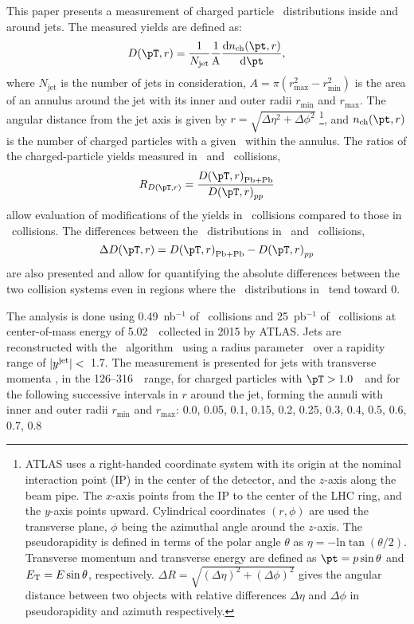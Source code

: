 This paper presents a measurement of charged particle \pt\ distributions inside and around jets. The measured yields are defined as:
  \begin{equation}
  \Dptr = \frac{1}{N_{\mathrm{jet}}} \frac{1}{\mathrm{A}} \frac{\mathrm{d} n_{\mathrm{ch}} (\pt, r)}{\mathrm{d} \pt},
\end{equation}
where $N_{\mathrm{jet}}$ is the number of jets in consideration, $A = \pi (r_{\mathrm{max}}^2 - r_{\mathrm{min}}^2) $ is the area of an annulus around the jet with its inner and outer radii $r_{\mathrm{min}}$ and $r_{\mathrm{max}}$. The angular distance from the jet axis is given by $r = \sqrt{\Delta \eta^2 + \Delta \phi^2}$ \footnote{ATLAS uses a right-handed coordinate system with its origin at the nominal interaction point (IP) in the center of the detector, and the $z$-axis along the beam pipe. The $x$-axis points from the IP to the center of the LHC ring, and the $y$-axis points upward. Cylindrical coordinates $(r, \phi)$ are used the transverse plane, $\phi$ being the azimuthal angle around the $z$-axis. The pseudorapidity is defined in terms of the polar angle $\theta$ as $\eta = - \text{ln} \tan (\theta/2)$. Transverse momentum and transverse energy are defined as $\pt = p \sin\theta$ and $\mbox{$E_{\mathrm{T}}$} = E \sin\theta$, respectively. $\Delta R = \sqrt{(\Delta \eta )^2 + (\Delta \phi)^2}$ gives the angular distance between two objects with relative differences $\Delta \eta$ and $\Delta \phi$ in pseudorapidity and azimuth respectively.}, and $n_{\mathrm{ch}}(\pt, r)$ is the number of charged particles with a given \pt\ within the annulus. The ratios of the charged-particle yields measured in \pbpb\ and \pp\ collisions,
\begin{equation}
   \RDptr = \frac{\Dptr_\mathrm{Pb+Pb}}{\Dptr_{pp}}
   \label{eq:rdptr}
\end{equation}
allow evaluation of modifications of the yields in \pbpb\ collisions compared to those in \pp\ collisions. The differences between the \Dptr\ distributions in \pbpb\ and \pp\ collisions, 
\begin{equation}
   \Delta \Dptr = \Dptr_\mathrm{Pb+Pb} - \Dptr_{pp}
   \label{eq:deltadptr}
\end{equation}
 are also presented and allow for quantifying the absolute differences between the two collision systems even in regions where the \Dptr\ distributions in \pp\ tend toward 0.

The analysis is done using 0.49~nb$^{-1}$ of \pbpb\ collisions and 
25~pb$^{-1}$ of \pp\ collisions at center-of-mass energy of 5.02~\TeV\ collected in 2015 by ATLAS.
Jets are reconstructed with the \antikt\ algorithm~\cite{Cacciari:2008qp} using a radius parameter \RFour\ over a rapidity range of $|\mbox{$y^{\mathrm{jet}}$}| <$~1.7. The measurement is presented for jets with transverse momenta \ptjet, in the 126--316~\GeV\ range, for charged particles with $\pT>1.0$~\GeV\ and for the following successive intervals in $r$ around the jet, forming the annuli with inner and outer radii $r_{\textrm{min}}$ and $r_{\textrm{max}}$: 0.0, 0.05, 0.1, 0.15, 0.2, 0.25, 0.3, 0.4, 0.5, 0.6, 0.7, 0.8

